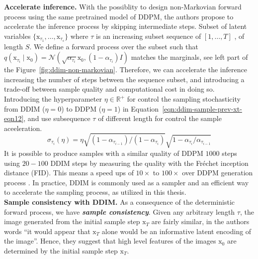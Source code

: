 \noindent \textbf{Accelerate inference.} With the possiblity to design non-Markovian forward process using the same pretrained model of DDPM, the authors propose to accelerate the inference process by skipping intermediate steps. Subset of latent variables $\{\mathrm{x}_{\tau_1}, \dots, \mathrm{x}_{\tau_{s}} \}$ where $\tau$ is an increasing subset sequence of $[1, \dots, T]$ , of length $S$. We define a forward process over the subset such that $q(\mathrm{x}_{\tau_i}\mid\mathrm{x}_{0})=\mathcal{N}(\sqrt{\alpha_{\tau_{i}}}\mathrm{x}_{0}, (1-\alpha_{\tau_{i}})I)$ matches the marginals, see left part of the Figure~\ref{fig:ddim-non-markovian}. Therefore, we can accelerate the inference increasing the number of steps between the sequence subset, and introducing a trade-off between sample quality and computational cost in doing so. \\

\noindent Introducing the hyperparameter $\eta\in\mathbb{R}^{+}$ for control the
sampling stochasticity from DDIM ($\eta=0$) to DDPM ($\eta=1$) in Equation~\ref{eqn:ddim-sample-prev-xt-eqn12}, and use subsequence $\tau$ of different length 
for control the sample aceeleration.
\begin{equation}\label{eqn:ddim-to-ddpm-variance}
    \sigma_{\tau_{i}}(\eta) = \eta \sqrt{(1-\alpha_{\tau_{i-1}}) / (1-\alpha_{\tau_{i}})}\sqrt{1-\alpha_{\tau_{i}}/\alpha_{\tau_{i-1}}}
\end{equation}
It is possible to produce samples with a similar quality of DDPM $1000$ steps using $20-100$ DDIM steps by measuring the quality with the Fréchet inception distance (FID). This means a speed ups of $10\times$ to $100\times$ over DDPM generation process \cite{song2020denoising}. In practice, DDIM is commonly used as a sampler and an efficient way to accelerate the sampling process, as utilized in this thesis. \\


\noindent \textbf{Sample consistency with DDIM.} As a consequence of the deterministic forward process, we have \textit{\textbf{sample consistency}}. Given any arbitrary length $\tau$, the image generated from the initial sample step $\mathrm{x}_{T}$ are fairly similar, in the authors words ``it would appear that $\mathrm{x}_{T}$ alone would be an informative latent encoding of the image''.  Hence, they suggest that high level features of the images $\mathrm{x}_{0}$ are determined by the initial sample step $\mathrm{x}_{T}$. \\

